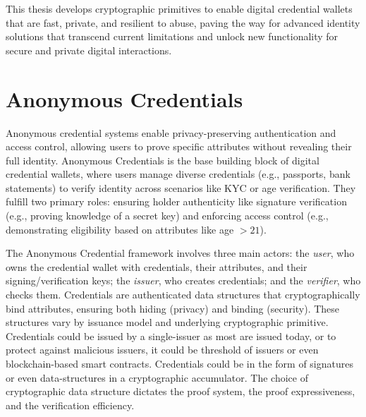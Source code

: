 This thesis develops cryptographic primitives to enable digital credential wallets that are fast, private, and resilient to abuse, paving the way for advanced identity solutions that transcend current limitations and unlock new functionality for secure and private digital interactions.


\section{Anonymous Credentials}
Anonymous credential systems enable privacy-preserving authentication and access control, allowing users to prove specific attributes without revealing their full identity. Anonymous Credentials is the base building block of digital credential wallets, where users manage diverse credentials (e.g., passports, bank statements) to verify identity across scenarios like KYC or age verification. They fulfill two primary roles: ensuring holder authenticity like signature verification (e.g., proving knowledge of a secret key) and enforcing access control (e.g., demonstrating eligibility based on attributes like age $ > 21 $).

The Anonymous Credential framework involves three main actors: the \emph{user}, who owns the credential wallet with credentials, their attributes, and their signing/verification keys; the \emph{issuer}, who creates credentials; and the \emph{verifier}, who checks them. Credentials are authenticated data structures that cryptographically bind attributes, ensuring both hiding (privacy) and binding (security). These structures vary by issuance model and underlying cryptographic primitive. Credentials could be issued by a single-issuer as most are issued today, or to protect against malicious issuers, it could be threshold of issuers or even blockchain-based smart contracts. Credentials could be in the form of signatures or even data-structures in a cryptographic accumulator. The choice of cryptographic data structure dictates the proof system, the proof expressiveness, and the verification efficiency.


